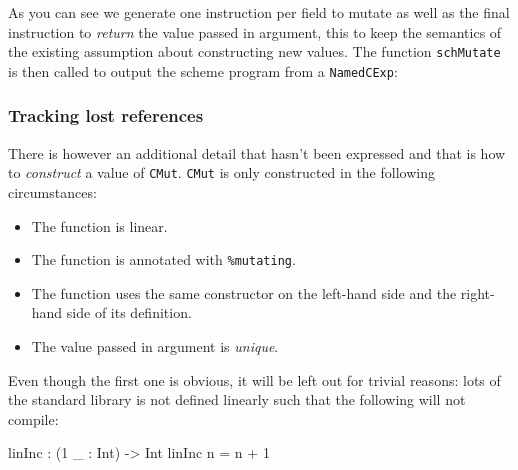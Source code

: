 \documentclass[
]{article}
\newenvironment{Shaded}{}{}
\newcommand{\DataTypeTok}[1]{\textcolor[rgb]{0.56,0.13,0.00}{#1}}
\newcommand{\DecValTok}[1]{\textcolor[rgb]{0.25,0.63,0.44}{#1}}
\newcommand{\FunctionTok}[1]{\textcolor[rgb]{0.02,0.16,0.49}{#1}}
\newcommand{\NormalTok}[1]{#1}
\newcommand{\OperatorTok}[1]{\textcolor[rgb]{0.40,0.40,0.40}{#1}}
\newcommand{\OtherTok}[1]{\textcolor[rgb]{0.00,0.44,0.13}{#1}}
\providecommand{\tightlist}{%
  \setlength{\itemsep}{0pt}\setlength{\parskip}{0pt}}
\begin{document}
As you can see we generate one instruction per field to mutate as well
as the final instruction to \emph{return} the value passed in argument,
this to keep the semantics of the existing assumption about constructing
new values. The function \texttt{schMutate} is then called to output the
scheme program from a \texttt{NamedCExp}:

\begin{Shaded}
\end{Shaded}

\hypertarget{tracking-lost-references}{%
\subsubsection{Tracking lost
references}\label{tracking-lost-references}}

There is however an additional detail that hasn't been expressed and
that is how to \emph{construct} a value of \texttt{CMut}. \texttt{CMut}
is only constructed in the following circumstances:

\begin{itemize}
\tightlist
\item
  The function is linear.
\item
  The function is annotated with \texttt{\%mutating}.
\item
  The function uses the same constructor on the left-hand side and the
  right-hand side of its definition.
\item
  The value passed in argument is \emph{unique}.
\end{itemize}

Even though the first one is obvious, it will be left out for trivial
reasons: lots of the standard library is not defined linearly such that
the following will not compile:

\begin{Shaded}
\begin{Highlighting}[]
\NormalTok{linInc }\OperatorTok{:}\NormalTok{ (}\DecValTok{1}\NormalTok{ \_ }\OperatorTok{:} \DataTypeTok{Int}\NormalTok{) }\OtherTok{{-}\textgreater{}} \DataTypeTok{Int}
\NormalTok{linInc n }\OtherTok{=}\NormalTok{ n }\OperatorTok{+} \DecValTok{1}
\end{Highlighting}
\end{Shaded}
\end{document}
